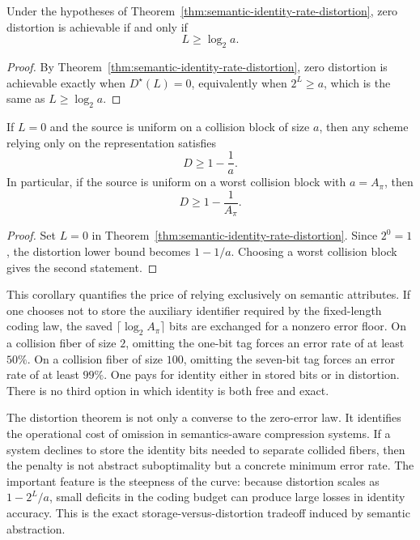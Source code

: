 \begin{corollary}\label{cor:zero-error-threshold-distortion}
Under the hypotheses of Theorem~\ref{thm:semantic-identity-rate-distortion}, zero distortion is achievable if and only if
\[
L \ge \log_2 a.
\]
\end{corollary}

\begin{proof}
By Theorem~\ref{thm:semantic-identity-rate-distortion}, zero distortion is achievable exactly when $D^\star(L)=0$, equivalently when $2^L \ge a$, which is the same as $L \ge \log_2 a$.
\end{proof}

\begin{corollary}\label{cor:zero-budget-error-floor}
If $L=0$ and the source is uniform on a collision block of size $a$, then any scheme relying only on the representation satisfies
\[
D \ge 1 - \frac{1}{a}.
\]
In particular, if the source is uniform on a worst collision block with $a=A_\pi$, then
\[
D \ge 1 - \frac{1}{A_\pi}.
\]
\end{corollary}

\begin{proof}
Set $L=0$ in Theorem~\ref{thm:semantic-identity-rate-distortion}. Since $2^0=1$, the distortion lower bound becomes $1-1/a$. Choosing a worst collision block gives the second statement.
\end{proof}

\begin{remark}
This corollary quantifies the price of relying exclusively on semantic attributes. If one chooses not to store the auxiliary identifier required by the fixed-length coding law, the saved $\lceil \log_2 A_\pi \rceil$ bits are exchanged for a nonzero error floor. On a collision fiber of size $2$, omitting the one-bit tag forces an error rate of at least $50\%$. On a collision fiber of size $100$, omitting the seven-bit tag forces an error rate of at least $99\%$. One pays for identity either in stored bits or in distortion. There is no third option in which identity is both free and exact.
\end{remark}

\begin{remark}
The distortion theorem is not only a converse to the zero-error law. It identifies the operational cost of omission in semantics-aware compression systems. If a system declines to store the identity bits needed to separate collided fibers, then the penalty is not abstract suboptimality but a concrete minimum error rate. The important feature is the steepness of the curve: because distortion scales as $1-2^L/a$, small deficits in the coding budget can produce large losses in identity accuracy. This is the exact storage-versus-distortion tradeoff induced by semantic abstraction.
\end{remark}

